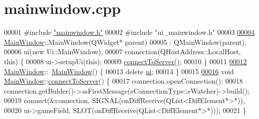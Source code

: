 \hypertarget{a00080_source}{}\section{mainwindow.\+cpp}
\label{a00080_source}

\begin{DoxyCode}
00001 \textcolor{preprocessor}{#}\textcolor{preprocessor}{include} \hyperlink{a00083}{"mainwindow.h"}
00002 \textcolor{preprocessor}{#}\textcolor{preprocessor}{include} \textcolor{preprocessor}{"ui\_mainwindow.h"}
00003 
\hyperlink{a00177_a8b244be8b7b7db1b08de2a2acb9409db}{00004} \hyperlink{a00177_a8b244be8b7b7db1b08de2a2acb9409db}{MainWindow}::MainWindow(QWidget* parent)
00005     : QMainWindow(parent),
00006       ui(\textcolor{keyword}{new} Ui::MainWindow),
00007       connection(QHostAddress::LocalHost, \textcolor{keyword}{this}) \{
00008   ui->setupUi(\textcolor{keyword}{this});
00009   \hyperlink{a00177_abfedef9edae209df536e8c1c7cf0e7ae}{connectToServer}\hyperlink{a00177_abfedef9edae209df536e8c1c7cf0e7ae}{(}\hyperlink{a00177_abfedef9edae209df536e8c1c7cf0e7ae}{)};
00010 \}
00011 
\hyperlink{a00177_ae98d00a93bc118200eeef9f9bba1dba7}{00012} \hyperlink{a00177_a8b244be8b7b7db1b08de2a2acb9409db}{MainWindow}::~\hyperlink{a00177_ae98d00a93bc118200eeef9f9bba1dba7}{MainWindow}() \{
00013   \textcolor{keyword}{delete} \hyperlink{a00177_a35466a70ed47252a0191168126a352a5}{ui};
00014 \}
00015 
\hyperlink{a00177_abfedef9edae209df536e8c1c7cf0e7ae}{00016} \textcolor{keywordtype}{void} \hyperlink{a00177_a8b244be8b7b7db1b08de2a2acb9409db}{MainWindow}::\hyperlink{a00177_abfedef9edae209df536e8c1c7cf0e7ae}{connectToServer}() \{
00017   connection.openConnection();
00018   connection.getBulder()->asFirstMessage(eConnectionType::eWatcher)->build();
00019   connect(&connection, SIGNAL(onDiffReceive(QList<DiffElement*>*)),
00020           ui->gameField, SLOT(onDiffReceive(QList<DiffElement*>*)));
00021 \}
\end{DoxyCode}
